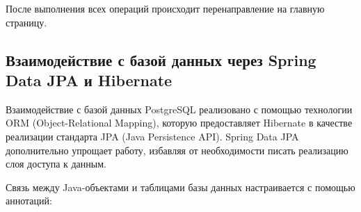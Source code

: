 \documentclass[oneside,a4paper,14pt]{extarticle}
\begin{document}
После выполнения всех операций происходит перенаправление на главную страницу.

\subsection*{Взаимодействие с базой данных через Spring Data JPA и Hibernate}
Взаимодействие с базой данных PostgreSQL реализовано с помощью технологии ORM (Object-Relational Mapping), которую предоставляет Hibernate в качестве реализации стандарта JPA (Java Persistence API). Spring Data JPA дополнительно упрощает работу, избавляя от необходимости писать реализацию слоя доступа к данным.

Связь между Java-объектами и таблицами базы данных настраивается с помощью аннотаций:
\end{document}
